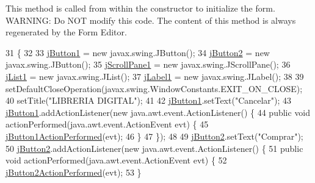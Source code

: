 This method is called from within the constructor to initialize the form. W\+A\+R\+N\+I\+NG\+: Do N\+OT modify this code. The content of this method is always regenerated by the Form Editor. 
\begin{DoxyCode}
31                                   \{
32 
33         \mbox{\hyperlink{class_interfaz_package_1_1_busqueda_lector_aafddbf0bf8e006576588abc987d139da}{jButton1}} = \textcolor{keyword}{new} javax.swing.JButton();
34         \mbox{\hyperlink{class_interfaz_package_1_1_busqueda_lector_a4c37aae2d858c81bf7cd2590bf39f62b}{jButton2}} = \textcolor{keyword}{new} javax.swing.JButton();
35         \mbox{\hyperlink{class_interfaz_package_1_1_busqueda_lector_abc4a324ddee78d264865afedf117ff86}{jScrollPane1}} = \textcolor{keyword}{new} javax.swing.JScrollPane();
36         \mbox{\hyperlink{class_interfaz_package_1_1_busqueda_lector_a79d4bc8896dcf47007cf4f1a138d8798}{jList1}} = \textcolor{keyword}{new} javax.swing.JList();
37         \mbox{\hyperlink{class_interfaz_package_1_1_busqueda_lector_a449890b71a3ddf1a45b169af153b364c}{jLabel1}} = \textcolor{keyword}{new} javax.swing.JLabel();
38 
39         setDefaultCloseOperation(javax.swing.WindowConstants.EXIT\_ON\_CLOSE);
40         setTitle(\textcolor{stringliteral}{"LIBRERIA DIGITAL"});
41 
42         \mbox{\hyperlink{class_interfaz_package_1_1_busqueda_lector_aafddbf0bf8e006576588abc987d139da}{jButton1}}.setText(\textcolor{stringliteral}{"Cancelar"});
43         \mbox{\hyperlink{class_interfaz_package_1_1_busqueda_lector_aafddbf0bf8e006576588abc987d139da}{jButton1}}.addActionListener(\textcolor{keyword}{new} java.awt.event.ActionListener() \{
44             \textcolor{keyword}{public} \textcolor{keywordtype}{void} actionPerformed(java.awt.event.ActionEvent evt) \{
45                 \mbox{\hyperlink{class_interfaz_package_1_1_busqueda_lector_aca34c3e668393db6c3cc644af9fbade9}{jButton1ActionPerformed}}(evt);
46             \}
47         \});
48 
49         \mbox{\hyperlink{class_interfaz_package_1_1_busqueda_lector_a4c37aae2d858c81bf7cd2590bf39f62b}{jButton2}}.setText(\textcolor{stringliteral}{"Comprar"});
50         \mbox{\hyperlink{class_interfaz_package_1_1_busqueda_lector_a4c37aae2d858c81bf7cd2590bf39f62b}{jButton2}}.addActionListener(\textcolor{keyword}{new} java.awt.event.ActionListener() \{
51             \textcolor{keyword}{public} \textcolor{keywordtype}{void} actionPerformed(java.awt.event.ActionEvent evt) \{
52                 \mbox{\hyperlink{class_interfaz_package_1_1_busqueda_lector_a263c105aa087b2de3d2c5b88a0252131}{jButton2ActionPerformed}}(evt);
53             \}

\end{DoxyCode}
